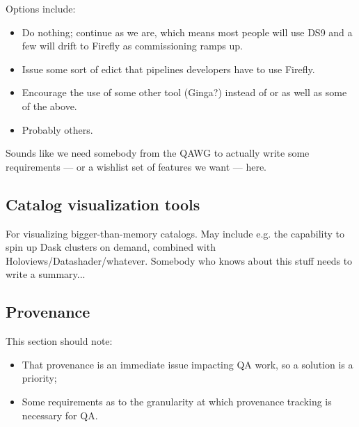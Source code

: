 \documentclass[DM,authoryear,toc,lsstdraft]{lsstdoc}
\begin{document}
Options include:

\begin{itemize}

  \item{Do nothing; continue as we are, which means most people will use DS9
  and a few will drift to Firefly as commissioning ramps up.}

  \item{Issue some sort of edict that pipelines developers have to use
  Firefly.}

  \item{Encourage the use of some other tool (Ginga?) instead of or as well as
  some of the above.}

  \item{Probably others.}

\end{itemize}

Sounds like we need somebody from the QAWG to actually write some requirements
--- or a wishlist set of features we want --- here.

\subsection{Catalog visualization tools}


For visualizing bigger-than-memory catalogs. May include e.g. the capability
to spin up Dask clusters on demand, combined with
Holoviews/Datashader/whatever. Somebody who knows about this stuff needs to
write a summary...

\subsection{Provenance}


This section should note:

\begin{itemize}

  \item{That provenance is an immediate issue impacting QA work, so a solution
  is a priority;}

  \item{Some requirements as to the granularity at which provenance tracking
  is necessary for QA.}

\end{itemize}

\appendix
\glsaddall
\printglossary[style=index]


\end{document}
